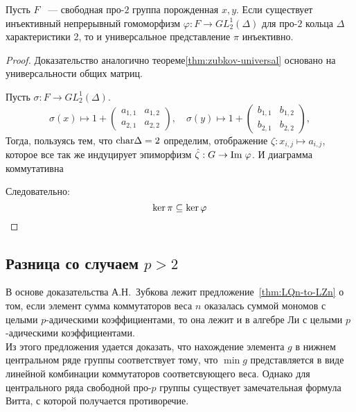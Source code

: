 \begin{theorem}
    Пусть $F$ ~--- свободная про-$2$ группа порожденная $x, y$.
    Если существует инъективный непрерывный гомоморфизм $\varphi: F \to GL^1_2(\Delta)$ для про-$2$ кольца $\Delta$ характеристики 2, то и универсальное представление $\pi$ инъективно.
\end{theorem}
\begin{proof}
    Доказательство аналогично теореме\ref{thm:zubkov-universal} основано на универсальности общих матриц.

    Пусть $\sigma: F\to GL_2^1(\Delta)$.
    \[
        \sigma (x) \mapsto 1 +
        \begin{pmatrix}
            a_{1,1} & a_{1,2} \\
            a_{2,1} & a_{2,2}
        \end{pmatrix}, \quad
        \sigma (y) \mapsto 1 +
        \begin{pmatrix}
            b_{1,1} & b_{1,2} \\
            b_{2,1} & b_{2,2}
        \end{pmatrix},
    \]
    Тогда, пользуясь тем, что $\mathrm{char} \Delta = 2$ определим, отображение $\zeta: x_{i,j}\mapsto a_{i,j}$, которое все так же индуцирует эпиморфизм $\hat{\zeta}: G \to \mathrm{Im}\hspace{0.1cm}{\varphi}$.
    И диаграмма коммутативна
    \begin{center}
    \end{center}
    Следовательно:
    \[
        \ker{\pi} \subseteq \ker{\varphi} \qedhere
    \]
\end{proof}

\subsection{Разница со случаем $p>2$}\label{subsec:ben-ezra-zelmanov-difference}
В основе доказательства А.Н.\ Зубкова лежит предложение~\ref{thm:LQn-to-LZn} о том,
если элемент сумма коммутаторов веса $n$ оказалась суммой мономов с целыми $p$-адическими коэффициентами, то она лежит и в алгебре Ли с целыми $p$-адическими коэффициентами.\\
Из этого предложения удается доказать, что нахождение элемента $g$ в нижнем центральном ряде группы соответствует тому, что $\min g$ представляется в виде линейной комбинации коммутаторов соответсвующего веса.
Однако для центрального ряда свободной про-$p$ группы существует замечательная формула Витта, с которой получается противоречие.


